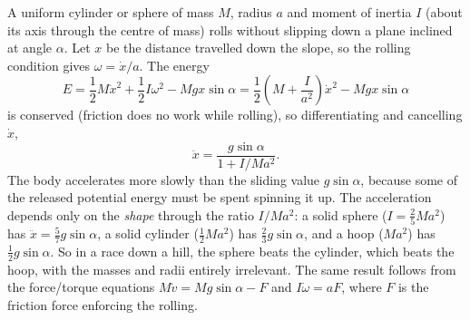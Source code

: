 \documentclass[a4paper]{scrartcl}
\begin{document}
\begin{center}
\end{center}

\begin{example}
	A uniform cylinder or sphere of mass $M$, radius $a$ and moment of inertia $I$ (about its axis through the centre of mass) rolls without slipping down a plane inclined at angle $\alpha$. Let $x$ be the distance travelled down the slope, so the rolling condition gives $\omega = \dot{x}/a$. The energy
	$$
	E = \frac{1}{2}M\dot{x}^2 + \frac{1}{2}I \omega^2 - Mgx \sin\alpha = \frac{1}{2}\left(M + \frac{I}{a^2}\right)\dot{x}^2 - Mg x \sin \alpha
	$$
	is conserved (friction does no work while rolling), so differentiating and cancelling $\dot{x}$,
	$$
	\ddot{x} = \frac{g \sin\alpha}{1 + I/Ma^2}.
	$$
	The body accelerates more slowly than the sliding value $g \sin\alpha$, because some of the released potential energy must be spent spinning it up. The acceleration depends only on the \emph{shape} through the ratio $I/Ma^2$: a solid sphere ($I = \frac{2}{5}Ma^2$) has $\ddot x = \frac{5}{7}g\sin\alpha$, a solid cylinder ($\frac{1}{2}Ma^2$) has $\frac{2}{3}g\sin\alpha$, and a hoop ($Ma^2$) has $\frac{1}{2}g \sin\alpha$. So in a race down a hill, the sphere beats the cylinder, which beats the hoop, with the masses and radii entirely irrelevant. The same result follows from the force/torque equations $M\dot v = Mg\sin\alpha - F$ and $I \dot\omega = aF$, where $F$ is the friction force enforcing the rolling.
\end{example}
\end{document}
